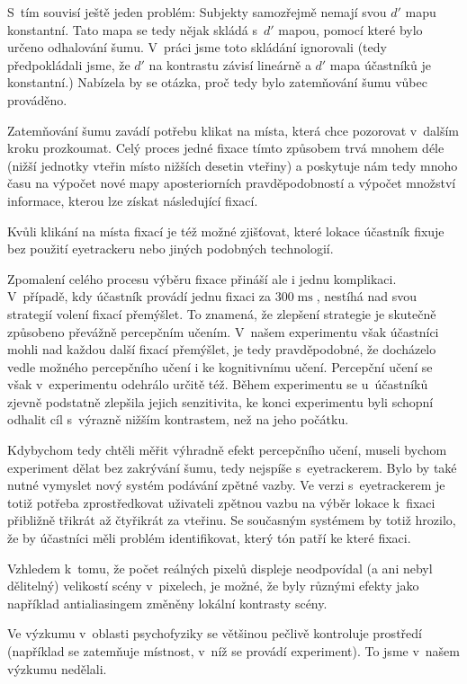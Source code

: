 S~tím souvisí ještě jeden problém: Subjekty samozřejmě nemají svou $d'$
mapu konstantní. Tato mapa se tedy nějak skládá s~$d'$ mapou, pomocí které
bylo určeno odhalování šumu. V~práci jsme toto skládání ignorovali (tedy
předpokládali jsme, že $d'$ na kontrastu závisí lineárně a $d'$ mapa účastníků
je konstantní.) Nabízela by se otázka, proč tedy bylo zatemňování šumu vůbec
prováděno.


Zatemňování šumu zavádí potřebu klikat na místa, která chce pozorovat
v~dalším kroku prozkoumat. Celý proces jedné fixace tímto způsobem trvá mnohem déle (nižší
jednotky vteřin místo nižších desetin vteřiny) a poskytuje nám tedy mnoho času
na výpočet nové mapy aposteriorních pravděpodobností a výpočet množství informace,
kterou lze získat následující fixací.

Kvůli klikání na místa fixací je též možné zjišťovat, které lokace účastník
fixuje bez použití eyetrackeru nebo jiných podobných technologií.

Zpomalení celého procesu výběru fixace přináší ale i jednu komplikaci. V~případě, kdy
účastník provádí jednu fixaci za $300\operatorname{ms}$, nestíhá nad svou
strategií volení fixací přemýšlet. To znamená, že zlepšení strategie je
skutečně způsobeno převážně percepčním učením. V~našem experimentu však
účastníci mohli nad každou další fixací přemýšlet, je tedy pravděpodobné, že
docházelo vedle možného percepčního učení  i ke kognitivnímu učení. Percepční
učení se však v~experimentu odehrálo určitě též.  Během experimentu se u~účastníků zjevně podstatně zlepšila jejich senzitivita, ke konci experimentu
byli schopní odhalit cíl s~výrazně nižším kontrastem, než na jeho počátku.

Kdybychom tedy chtěli měřit výhradně efekt percepčního učení, museli by\-chom
experiment dělat bez zakrývání šumu, tedy nejspíše s~eyetrackerem. Bylo by
také nutné vymyslet nový systém podávání zpětné vazby. Ve verzi s~eyetrackerem je totiž
potřeba zprostředkovat uživateli zpětnou vazbu na výběr lokace k~fixaci přibližně třikrát až čtyřikrát 
za vteřinu. Se současným systémem
by totiž hrozilo, že by účastníci měli problém identifikovat, který tón patří ke které fixaci.

Vzhledem k~tomu, že počet reálných pixelů displeje neodpovídal (a ani
nebyl dělitelný) velikostí scény v~pixelech, je možné, že byly různými efekty jako
například antialiasingem změněny lokální kontrasty scény.

Ve výzkumu v~oblasti psychofyziky se většinou
pečlivě kontroluje prostředí (například se zatemňuje místnost, v~níž se provádí experiment). To jsme v~našem výzkumu nedělali.

